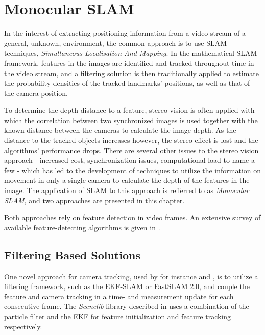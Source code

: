 \chapter{Monocular SLAM}
\label{cha:monoslam}
    In the interest of extracting positioning information from a video stream
    of a general, unknown, environment, the common approach is to use SLAM techniques,
    \textit{Simultaneous Localisation And Mapping}.
    In the mathematical SLAM framework, features in the images are identified
    and tracked throughout time in the video stream, and a filtering solution
    is then traditionally applied to estimate the probability densities
    of the tracked landmarks' positions, as well as that of the camera position.

    To determine the depth distance to a feature, stereo vision is often applied
    with which the correlation between two synchronized images is used together with the known
    distance between the cameras to calculate the image depth.
    As the distance to the tracked objects increases however, the stereo
    effect is lost and the algorithms' performance drops.
    There are several other issues to the stereo vision approach - increased
    cost, synchronization issues, computational load to name a few - which has
    led to the development of techniques to utilize the information on movement in only a single
    camera to calculate the depth of the features in the image.
    The application of SLAM to this approach is refferred to as \textit{Monocular SLAM},
    and two approaches are presented in this chapter.

    Both approaches rely on feature detection in video frames.
    An extensive survey of available feature-detecting algorithms
    is given in \citep{idris09reviewoffeaturedetection}.

    \section{Filtering Based Solutions}
        \label{sec:video:filtersolutions}
        One novel approach for camera tracking, used by for instance \citep{DBLP:conf/iccv/Davison03} and \citep{Eade:2006:SMS:1153170.1153506},
        is to utilize a filtering framework, such as the EKF-SLAM or FastSLAM 2.0,
        and couple the feature and camera tracking in a time- and measurement
        update for each consecutive frame.
        The \textit{Scenelib} library described in \citep{DBLP:conf/iccv/Davison03}
        uses a combination of the particle filter and the EKF for feature initialization
        and feature tracking respectively.

